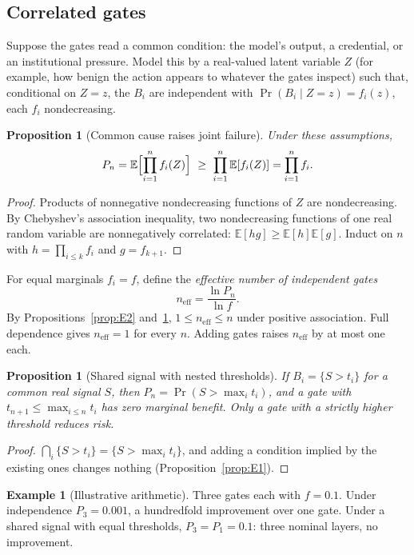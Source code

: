 \documentclass[11pt]{article}
\newtheorem{proposition}[theorem]{Proposition}
\theoremstyle{definition}
\newtheorem{example}[theorem]{Example}
\begin{document}
\subsection{Correlated gates}

Suppose the gates read a common condition: the model's output, a credential, or an institutional pressure. Model this by a real-valued latent variable $Z$ (for example, how benign the action appears to whatever the gates inspect) such that, conditional on $Z=z$, the $B_i$ are independent with $\Pr(B_i\mid Z=z)=f_i(z)$, each $f_i$ nondecreasing.

\begin{proposition}[Common cause raises joint failure]\label{prop:E3}
Under these assumptions,
\[
P_n=\mathbb{E}\Bigl[\prod_{i=1}^nf_i(Z)\Bigr]\ \ge\ \prod_{i=1}^n\mathbb{E}[f_i(Z)]=\prod_{i=1}^nf_i .
\]
\end{proposition}
\begin{proof}
Products of nonnegative nondecreasing functions of $Z$ are nondecreasing. By Chebyshev's association inequality, two nondecreasing functions of one real random variable are nonnegatively correlated: $\mathbb{E}[hg]\ge\mathbb{E}[h]\mathbb{E}[g]$. Induct on $n$ with $h=\prod_{i\le k}f_i$ and $g=f_{k+1}$.
\end{proof}

For equal marginals $f_i=f$, define the \emph{effective number of independent gates}
\[
n_{\mathrm{eff}}=\frac{\ln P_n}{\ln f}.
\]
By Propositions~\ref{prop:E2} and~\ref{prop:E3}, $1\le n_{\mathrm{eff}}\le n$ under positive association. Full dependence gives $n_{\mathrm{eff}}=1$ for every $n$. Adding gates raises $n_{\mathrm{eff}}$ by at most one each.

\begin{proposition}[Shared signal with nested thresholds]\label{prop:E4}
If $B_i=\{S>t_i\}$ for a common real signal $S$, then $P_n=\Pr(S>\max_it_i)$, and a gate with $t_{n+1}\le\max_{i\le n}t_i$ has zero marginal benefit. Only a gate with a strictly higher threshold reduces risk.
\end{proposition}
\begin{proof}
$\bigcap_i\{S>t_i\}=\{S>\max_it_i\}$, and adding a condition implied by the existing ones changes nothing (Proposition~\ref{prop:E1}).
\end{proof}

\begin{example}[Illustrative arithmetic]
Three gates each with $f=0.1$. Under independence $P_3=0.001$, a hundredfold improvement over one gate. Under a shared signal with equal thresholds, $P_3=P_1=0.1$: three nominal layers, no improvement.
\end{example}
\end{document}
